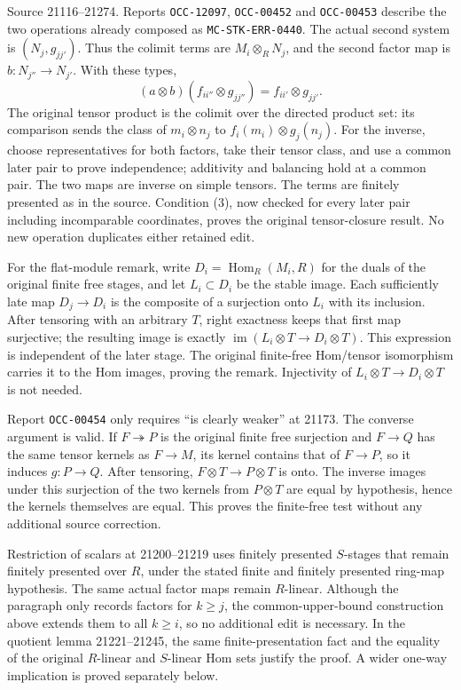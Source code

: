 Source 21116--21274. Reports \texttt{OCC-12097}, \texttt{OCC-00452} and \texttt{OCC-00453} describe the two operations already composed as \texttt{MC-\AlgebraIdentifierBreak{}STK-\AlgebraIdentifierBreak{}ERR-\AlgebraIdentifierBreak{}0440}. The actual second system is \((N_j,g_{jj'})\). Thus the colimit terms are \(M_i\otimes_R N_j\), and the second factor map is \(b:N_{j''}\to N_{j'}\). With these types, \[
(a\otimes b)(f_{ii''}\otimes g_{jj''})
=f_{ii'}\otimes g_{jj'}.
\] The original tensor product is the colimit over the directed product set: its comparison sends the class of \(m_i\otimes n_j\) to \(f_i(m_i)\otimes g_j(n_j)\). For the inverse, choose representatives for both factors, take their tensor class, and use a common later pair to prove independence; additivity and balancing hold at a common pair. The two maps are inverse on simple tensors. The terms are finitely presented as in the source. Condition (3), now checked for every later pair including incomparable coordinates, proves the original tensor-closure result. No new operation duplicates either retained edit.

For the flat-module remark, write \(D_i=\operatorname{Hom}_R(M_i,R)\) for the duals of the original finite free stages, and let \(L_i\subset D_i\) be the stable image. Each sufficiently late map \(D_j\to D_i\) is the composite of a surjection onto \(L_i\) with its inclusion. After tensoring with an arbitrary \(T\), right exactness keeps that first map surjective; the resulting image is exactly \(\operatorname{im}(L_i\otimes T\to D_i\otimes T)\). This expression is independent of the later stage. The original finite-free Hom/tensor isomorphism carries it to the Hom images, proving the remark. Injectivity of \(L_i\otimes T\to D_i\otimes T\) is not needed.

Report \texttt{OCC-00454} only requires ``is clearly weaker'' at 21173. The converse argument is valid. If \(F\twoheadrightarrow P\) is the original finite free surjection and \(F\to Q\) has the same tensor kernels as \(F\to M\), its kernel contains that of \(F\to P\), so it induces \(g:P\to Q\). After tensoring, \(F\otimes T\to P\otimes T\) is onto. The inverse images under this surjection of the two kernels from \(P\otimes T\) are equal by hypothesis, hence the kernels themselves are equal. This proves the finite-free test without any additional source correction.

Restriction of scalars at 21200--21219 uses finitely presented \(S\)-stages that remain finitely presented over \(R\), under the stated finite and finitely presented ring-map hypothesis. The same actual factor maps remain \(R\)-linear. Although the paragraph only records factors for \(k\geq j\), the common-upper-bound construction above extends them to all \(k\geq i\), so no additional edit is necessary. In the quotient lemma 21221--21245, the same finite-presentation fact and the equality of the original \(R\)-linear and \(S\)-linear Hom sets justify the proof. A wider one-way implication is proved separately below.

